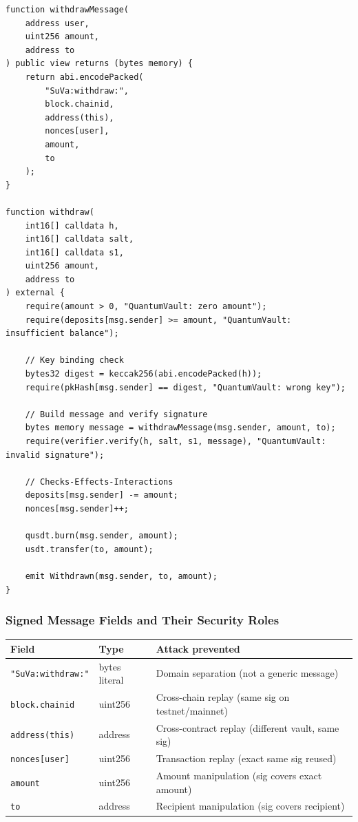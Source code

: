 \documentclass[11pt,a4paper]{article}
\begin{document}
\begin{lstlisting}[style=solidity, caption={withdrawMessage and withdraw implementation}]
function withdrawMessage(
    address user,
    uint256 amount,
    address to
) public view returns (bytes memory) {
    return abi.encodePacked(
        "SuVa:withdraw:",
        block.chainid,
        address(this),
        nonces[user],
        amount,
        to
    );
}

function withdraw(
    int16[] calldata h,
    int16[] calldata salt,
    int16[] calldata s1,
    uint256 amount,
    address to
) external {
    require(amount > 0, "QuantumVault: zero amount");
    require(deposits[msg.sender] >= amount, "QuantumVault: insufficient balance");

    // Key binding check
    bytes32 digest = keccak256(abi.encodePacked(h));
    require(pkHash[msg.sender] == digest, "QuantumVault: wrong key");

    // Build message and verify signature
    bytes memory message = withdrawMessage(msg.sender, amount, to);
    require(verifier.verify(h, salt, s1, message), "QuantumVault: invalid signature");

    // Checks-Effects-Interactions
    deposits[msg.sender] -= amount;
    nonces[msg.sender]++;

    qusdt.burn(msg.sender, amount);
    usdt.transfer(to, amount);

    emit Withdrawn(msg.sender, to, amount);
}
\end{lstlisting}

\subsubsection{Signed Message Fields and Their Security Roles}

\begin{center}
\begin{tabular}{lll}
\toprule
\textbf{Field} & \textbf{Type} & \textbf{Attack prevented} \\
\midrule
\texttt{"SuVa:withdraw:"} & bytes literal & Domain separation (not a generic message) \\
\texttt{block.chainid} & uint256 & Cross-chain replay (same sig on testnet/mainnet) \\
\texttt{address(this)} & address & Cross-contract replay (different vault, same sig) \\
\texttt{nonces[user]} & uint256 & Transaction replay (exact same sig reused) \\
\texttt{amount} & uint256 & Amount manipulation (sig covers exact amount) \\
\texttt{to} & address & Recipient manipulation (sig covers recipient) \\
\bottomrule
\end{tabular}
\end{center}
\end{document}
